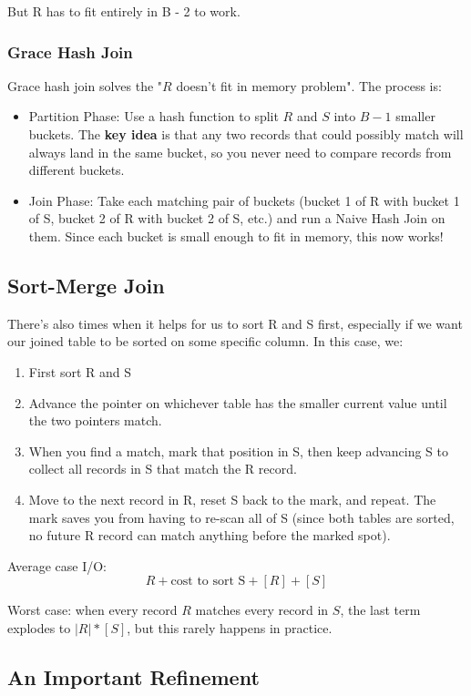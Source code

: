 \documentclass{article}
\begin{document}
But R has to fit entirely in B - 2 to work.

\subsubsection{Grace Hash Join}
Grace hash join solves the "$R$ doesn't fit in memory problem". The process is:
\begin{itemize}
    \item Partition Phase: Use a hash function to split $R$ and $S$ into $B-1$ smaller buckets. The \textbf{key idea} is that any two records that could possibly match will always land in the same bucket, so you never need to compare records from different buckets.
    \item Join Phase: Take each matching pair of buckets (bucket 1 of R with bucket 1 of S, bucket 2 of R with bucket 2 of S, etc.) and run a Naive Hash Join on them. Since each bucket is small enough to fit in memory, this now works!
\end{itemize}

\subsection{Sort-Merge Join}
There’s also times when it helps for us to sort R and S first, especially if we want our joined table to be sorted on some specific column. In this case, we:
\begin{enumerate}
    \item First sort R and S
    \item Advance the pointer on whichever table has the smaller current value until the two pointers match.
    \item When you find a match, mark that position in S, then keep advancing S to collect all records in S that match the R record.
    \item Move to the next record in R, reset S back to the mark, and repeat. The mark saves you from having to re-scan all of S (since both tables are sorted, no future R record can match anything before the marked spot).
\end{enumerate}

Average case I/O:
\[
R + \text{cost to sort S} + [R] + [S]
\]

Worst case: when every record $R$ matches every record in $S$, the last term explodes to $|R| * [S]$, but this rarely happens in practice.

\subsection{An Important Refinement}
\end{document}
